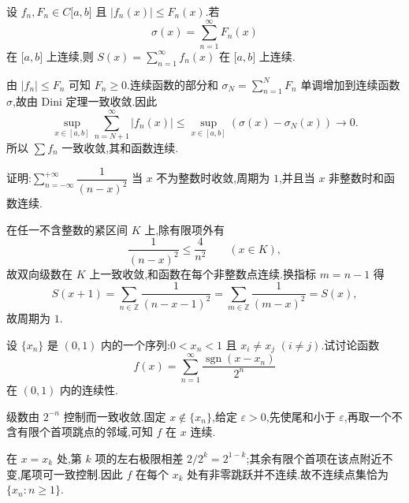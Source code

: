 \begin{example}
    设 $f_n,F_n\in C\lbrack a,b\rbrack$ 且 $|f_n(x)|\leq F_n(x)$.若
    \[
        \sigma(x)=\sum\limits_{n=1}^{\infty}F_n(x)
    \]
    在 $\lbrack a,b\rbrack$ 上连续,则 $S(x)=\displaystyle\sum\limits_{n=1}^{\infty}f_n(x)$ 在 $\lbrack a,b\rbrack$ 上连续.
\end{example}
\exampleblank

\begin{solution}
    由 $|f_n|\leq F_n$ 可知 $F_n\geq0$.连续函数的部分和
    $\sigma_N=\displaystyle\sum_{n=1}^{N}F_n$ 单调增加到连续函数 $\sigma$,故由 Dini 定理一致收敛.因此
    \[
        \sup_{x\in[a,b]}\sum\limits_{n=N+1}^{\infty}|f_n(x)|
        \leq\sup_{x\in[a,b]}\left(\sigma(x)-\sigma_N(x)\right)\longrightarrow0.
    \]
    所以 $\displaystyle\sum f_n$ 一致收敛,其和函数连续.
\end{solution}

\begin{example}
    证明:$\displaystyle\sum\limits_{n=-\infty}^{+\infty}\dfrac{1}{(n-x)^2}$ 当 $x$ 不为整数时收敛,周期为 $1$,并且当 $x$ 非整数时和函数连续.
\end{example}
\exampleblank

\begin{solution}
    在任一不含整数的紧区间 $K$ 上,除有限项外有
    \[
        \dfrac{1}{(n-x)^2}\leq\dfrac{4}{n^2}\qquad(x\in K),
    \]
    故双向级数在 $K$ 上一致收敛,和函数在每个非整数点连续.换指标
    $m=n-1$ 得
    \[
        S(x+1)=\sum\limits_{n\in\mathbb{Z}}\dfrac{1}{(n-x-1)^2}
        =\sum\limits_{m\in\mathbb{Z}}\dfrac{1}{(m-x)^2}=S(x),
    \]
    故周期为 $1$.
\end{solution}

\begin{example}[\markstar]
    设 $\{x_n\}$ 是 $(0,1)$ 内的一个序列:$0<x_n<1$ 且 $x_i\neq x_j$ $(i\neq j)$.试讨论函数
    \[
        f(x)=\sum\limits_{n=1}^{\infty}\dfrac{\operatorname{sgn}(x-x_n)}{2^n}
    \]
    在 $(0,1)$ 内的连续性.
\end{example}
\exampleblank

\begin{solution}
    级数由 $2^{-n}$ 控制而一致收敛.固定 $x\notin\{x_n\}$,给定
    $\varepsilon>0$,先使尾和小于 $\varepsilon$,再取一个不含有限个首项跳点的邻域,可知 $f$ 在 $x$ 连续.

    在 $x=x_k$ 处,第 $k$ 项的左右极限相差 $2/2^k=2^{1-k}$;其余有限个首项在该点附近不变,尾项可一致控制.因此 $f$ 在每个 $x_k$ 处有非零跳跃并不连续.故不连续点集恰为 $\{x_n:n\geq1\}$.
\end{solution}



